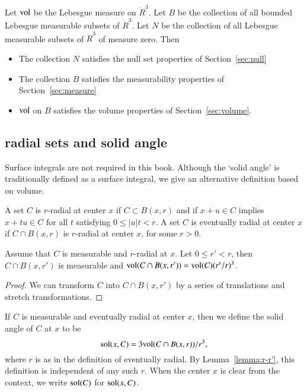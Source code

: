 \begin{lemma}  Let ${\operatorname{vol}}$ be the Lebesgue measure
on $\ring{R}^3$. Let $B$ be the collection of all bounded Lebesgue
measurable subsets of $\ring{R}^3$.  Let $N$ be the collection of all
Lebesgue measurable subsets of $\ring{R}^3$ of measure zero.
Then
\begin{itemize}
\item  The collection $N$ satisfies the null set properties of Section~\ref{sec:null}
\item The collection $B$ satisfies the measurability properties of Section~\ref{sec:measure}
\item  ${\operatorname{vol}}$ on $B$ satisfies the volume properties of Section~\ref{sec:volume}.  
\end{itemize}
\end{lemma}

\subsection{radial sets and solid angle}\label{sec:solid}


Surface integrals are not required in this book.  Although
the `solid angle' is traditionally defined as a surface integral,
we give an alternative definition based on volume.


\begin{definition}
    A set $C$ is $r$-radial at center $x$ if  $C\subset B(x,r)$
    and if
        $x + u \in C$ implies
        $x + t u \in C$ for all $t$ satisfying $0\le |u| t < r$.
A set $C$ is eventually radial at center $x$ if $C\cap B(x,r)$ is
$r$-radial at center $x$, for some $r>0$.
\end{definition}

\begin{lemma}
Assume that $C$ is measurable and $r$-radial at $x$.  Let $0\le r'<r$,
then $C\cap B(x,r')$ is measurable and
${\operatorname{vol}}(C\cap B(x,r')) = {\operatorname{vol}}(C) (r'/r)^3$.
\end{lemma}

\begin{proof}  We can transform $C$ into $C\cap B(x,r')$ by
a series of translations and stretch transformations.
\end{proof}


\begin{definition}
If $C$ is measurable and eventually radial at center $x$, then we
define the solid angle of $C$ at $x$ to be
    $$
    {\operatorname{sol}}(x,C) = 3 {\operatorname{vol}}(C\cap B(x,r))/r^3,
    $$
where $r$ is as in the definition of eventually radial. 
By Lemma~\ref{lemma:r-r'}, this
definition is independent of any such $r$.  When the center $x$ is
clear from the context, we write ${\operatorname{sol}}(C)$ for
${\operatorname{sol}}(x,C)$.
\end{definition}



